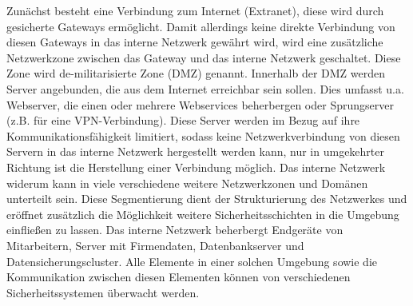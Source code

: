 Zunächst besteht eine Verbindung zum Internet (Extranet), diese wird durch gesicherte Gateways ermöglicht. Damit allerdings keine direkte Verbindung von diesen Gateways in das interne Netzwerk gewährt wird, wird eine zusätzliche Netzwerkzone zwischen das Gateway und das interne Netzwerk geschaltet. Diese Zone wird de-militarisierte Zone (DMZ) genannt. Innerhalb der DMZ werden Server angebunden, die aus dem Internet erreichbar sein sollen. Dies umfasst u.a. Webserver, die einen oder mehrere Webservices beherbergen oder Sprungserver (z.B. für eine VPN-Verbindung). Diese Server werden im Bezug auf ihre Kommunikationsfähigkeit limitiert, sodass keine Netzwerkverbindung von diesen Servern in das interne Netzwerk hergestellt werden kann, nur in umgekehrter Richtung ist die Herstellung einer Verbindung möglich. Das interne Netzwerk widerum kann in viele verschiedene weitere Netzwerkzonen und Domänen unterteilt sein. Diese Segmentierung dient der Strukturierung des Netzwerkes und eröffnet zusätzlich die Möglichkeit weitere Sicherheitsschichten in die Umgebung einfließen zu lassen. Das interne Netzwerk beherbergt Endgeräte von Mitarbeitern, Server mit Firmendaten, Datenbankserver und Datensicherungscluster. Alle Elemente in einer solchen Umgebung sowie die Kommunikation zwischen diesen Elementen können von verschiedenen Sicherheitssystemen überwacht werden. 

